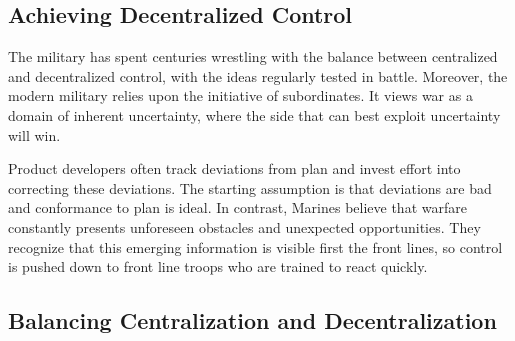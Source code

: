 \documentclass{article}
\begin{document}
\begin{center}
     \section{Achieving Decentralized Control}
\end{center}

\begin{multicols}{2}

\noindent
The military has spent centuries wrestling with the balance between centralized and decentralized control, with the ideas regularly tested in battle. Moreover, the modern military relies upon the initiative of subordinates. It views war as a domain of inherent uncertainty, where the side that can best exploit uncertainty will win.

Product developers often track deviations from plan and invest effort into correcting these deviations. The starting assumption is that deviations are bad and conformance to plan is ideal. In contrast, Marines believe that warfare constantly presents unforeseen obstacles and unexpected opportunities. They recognize that this emerging information is visible first the front lines, so control is pushed down to front line troops who are trained to react quickly.

\end{multicols}

\begin{center}
\section{Balancing Centralization and Decentralization}
\end{center}
\end{document}
